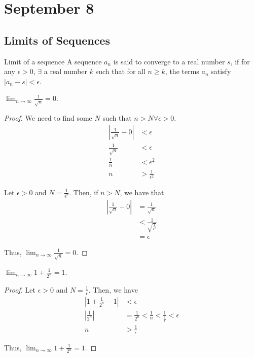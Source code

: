 \section{September 8}

\subsection{Limits of Sequences}
\begin{definition}{Limit of a sequence}{}
    A sequence $a_n$ is said to converge to a real number $s$, if for any $\epsilon > 0$, $\exists$ a real number $k$ such that for all $n \geq k$, the terms $a_n$ satisfy $|a_n - s| < \epsilon$.
\end{definition}

\begin{theorem}{}{}
    $\lim_{n \to \infty} \frac{1}{\sqrt{n}} = 0$.
\end{theorem}
\begin{proof}
    We need to find some $N$ such that $n > N \forall \epsilon > 0$.
    \begin{align*}
        | \frac{1}{\sqrt{n}} - 0 | &< \epsilon \\
        \frac{1}{\sqrt{n}} &< \epsilon \\
        \frac{1}{n} &< \epsilon^2 \\
        n &> \frac{1}{\epsilon^2}
    \end{align*}
    
    Let $\epsilon > 0$ and $N = \frac{1}{\epsilon^2}$. Then, if $n > N$, we have that
    \begin{align*}
        | \frac{1}{\sqrt{n}} - 0 | &= \frac{1}{\sqrt{n}} \\
        &< \frac{1}{\sqrt{\frac{1}{\epsilon^2}}} \\
        &= \epsilon
    \end{align*}

    Thus, $\lim_{n \to \infty} \frac{1}{\sqrt{n}} = 0$.
\end{proof}

\begin{theorem}{}{}
    $\lim_{n \to \infty} 1 + \frac{1}{2^n} = 1$.
\end{theorem}
\begin{proof}
    Let $\epsilon > 0$ and $N = \frac{1}{\epsilon}$. Then, we have
    \begin{align*}
        | 1 + \frac{1}{2^n} - 1 | &< \epsilon \\
        | \frac{1}{2^n} | &= \frac{1}{2^n} < \frac{1}{n} < \frac{1}{\frac{1}{\epsilon}} < \epsilon \\
        n &> \frac{1}{\epsilon}
    \end{align*}

    Thus, $\lim_{n \to \infty} 1 + \frac{1}{2^n} = 1$.
\end{proof}

